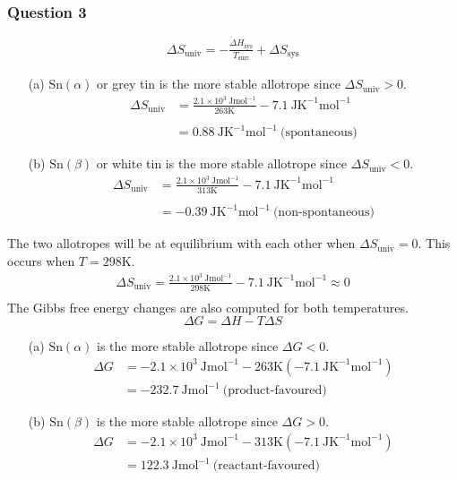 \documentclass[11pt,a4paper]{article}
\begin{document}
\subsubsection*{Question 3}
	\begin{align*}
		\Delta S_{\text{univ}} = -\frac{\Delta H_{\text{sys}}}{T_{\text{surr}}} + \Delta S_{\text{sys}}
	\end{align*}
	
	\begin{enumerate}
		\item[(a)] $\text{Sn}(\alpha)$ or grey tin is the more stable allotrope since $\Delta S_{\text{univ}} > 0$.
			\begin{align*}
				\Delta S_{\text{univ}} &= \frac{2.1 \times 10^3 \ \text{Jmol}^{-1}}{263 \text{K}} - 7.1 \ \text{JK}^{-1}\text{mol}^{-1} \\
				\\
				&= 0.88 \ \text{JK}^{-1}\text{mol}^{-1} \ \text{(spontaneous)}
			\end{align*}
		\item[(b)] $\text{Sn}(\beta)$ or white tin is the more stable allotrope since $\Delta S_{\text{univ}} < 0$.
			\begin{align*}
				\Delta S_{\text{univ}} &= \frac{2.1 \times 10^3 \ \text{Jmol}^{-1}}{313 \text{K}} - 7.1 \ \text{JK}^{-1}\text{mol}^{-1} \\
				\\
				&= -0.39 \ \text{JK}^{-1}\text{mol}^{-1} \ \text{(non-spontaneous)}
			\end{align*}
	\end{enumerate}
	The two allotropes will be at equilibrium with each other when $\Delta S_{\text{univ}} = 0$. This occurs when $T = 298 \text{K}$. \\
	\begin{align*}
		\Delta S_{\text{univ}} = \frac{2.1 \times 10^3 \ \text{Jmol}^{-1}}{298 \text{K}} - 7.1 \ \text{JK}^{-1}\text{mol}^{-1} \approx 0 \\
	\end{align*}
	The Gibbs free energy changes are also computed for both temperatures.
	$$\Delta G = \Delta H - T \Delta S$$
	\begin{enumerate}	
		\item[(a)] $\text{Sn}(\alpha)$ is the more stable allotrope since $\Delta G < 0$.
			\begin{align*} 
				\Delta G &= -2.1 \times 10^3 \ \text{Jmol}^{-1} - 263 \text{K} \left(- 7.1 \ \text{JK}^{-1}\text{mol}^{-1}\right) \\
				&=-232.7 \ \text{Jmol}^{-1} \ \text{(product-favoured)}
			\end{align*}
		\item[(b)] $\text{Sn}(\beta)$ is the more stable allotrope since $\Delta G > 0$.
			\begin{align*}
				\Delta G &= -2.1 \times 10^3 \ \text{Jmol}^{-1} - 313 \text{K} \left(- 7.1 \ \text{JK}^{-1}\text{mol}^{-1}\right) \\
				&=122.3 \ \text{Jmol}^{-1}  \ \text{(reactant-favoured)}
			\end{align*}
	\end{enumerate}
\end{document}
